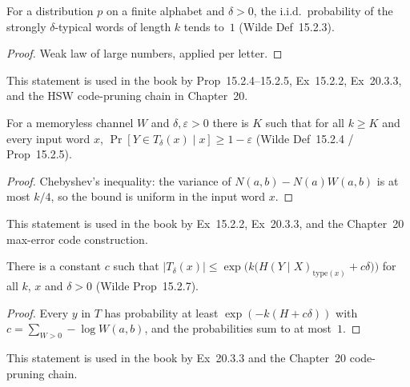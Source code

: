 \begin{theorem}
  \label{thm:strongTypical_prob_tendsto_one}
  For a distribution $p$ on a finite alphabet and $\delta>0$, the i.i.d.\
  probability of the strongly $\delta$-typical words of length $k$ tends to~$1$
  (Wilde Def~15.2.3).
\end{theorem}

\begin{proof}
  Weak law of large numbers, applied per letter.
\end{proof}

This statement is used in the book by Prop~15.2.4--15.2.5, Ex~15.2.2,
Ex~20.3.3, and the HSW code-pruning chain in Chapter~20.

\begin{theorem}
  \label{thm:condTypical_prob}
  For a memoryless channel $W$ and $\delta,\varepsilon>0$ there is $K$ such that
  for all $k\ge K$ and every input word $x$,
  $\Pr[Y\in T_\delta(x)\mid x]\ge 1-\varepsilon$
  (Wilde Def~15.2.4 / Prop~15.2.5).
\end{theorem}

\begin{proof}
  Chebyshev's inequality: the variance of $N(a,b)-N(a)W(a,b)$ is at most $k/4$,
  so the bound is uniform in the input word $x$.
\end{proof}

This statement is used in the book by Ex~15.2.2, Ex~20.3.3, and the Chapter~20
max-error code construction.

\begin{theorem}
  \label{thm:condTypical_card_le}
  There is a constant $c$ such that
  $\lvert T_\delta(x)\rvert \le \exp\bigl(k\bigl(H(Y\mid X)_{\mathrm{type}(x)}+c\delta\bigr)\bigr)$
  for all $k$, $x$ and $\delta>0$ (Wilde Prop~15.2.7).
\end{theorem}

\begin{proof}
  Every $y$ in $T$ has probability at least $\exp(-k(H+c\delta))$ with
  $c=\sum_{W>0}-\log W(a,b)$, and the probabilities sum to at most~$1$.
\end{proof}

This statement is used in the book by Ex~20.3.3 and the Chapter~20
code-pruning chain.

